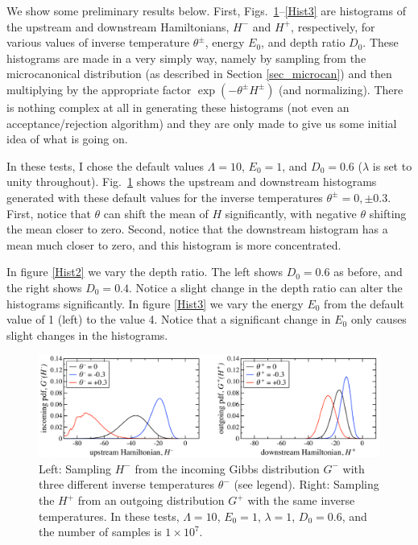 \documentclass[12pt]{article}
\begin{document}
We show some preliminary results below. First, Figs.~\ref{Hist1}--\ref{Hist3} are histograms of the upstream and downstream Hamiltonians, $H^-$ and $H^+$, respectively, for various values of inverse temperature $\theta^{\pm}$, energy $E_0$, and depth ratio $D_0$. These histograms are made in a very simply way, namely by sampling from the microcanonical distribution (as described in Section \ref{sec_microcan}) and then multiplying by the appropriate factor $\exp(-\theta^{\pm} H^{\pm})$ (and normalizing). There is nothing complex at all in generating these histograms (not even an acceptance/rejection algorithm) and they are only made to give us some initial idea of what is going on.

In these tests, I chose the default values $\Lambda = 10$, $E_0 = 1$, and $D_0 = 0.6$ ($\lambda$ is set to unity throughout). Fig.~\ref{Hist1} shows the upstream and downstream histograms generated with these default values for the inverse temperatures $\theta^{\pm} = 0, \pm 0.3$. First, notice that $\theta$ can shift the mean of $H$ significantly, with negative $\theta$ shifting the mean closer to zero. Second, notice that the downstream histogram has a mean much closer to zero, and this histogram is more concentrated.

In figure \ref{Hist2} we vary the depth ratio. The left shows $D_0 = 0.6$ as before, and the right shows $D_0 = 0.4$. Notice a slight change in the depth ratio can alter the histograms significantly. In figure \ref{Hist3} we vary the energy $E_0$ from the default value of 1 (left) to the value 4. Notice that a significant change in $E_0$ only causes slight changes in the histograms.

\begin{figure}[p]%
\begin{center}
\includegraphics[width = 0.8 \textwidth]{Hist1}
\caption{Left: Sampling $H^-$ from the incoming Gibbs distribution $G^-$ with three different inverse temperatures $\theta^-$ (see legend). Right: Sampling the $H^+$ from an outgoing distribution $G^+$ with the same inverse temperatures.
In these tests, $\Lambda = 10$, $E_0 = 1$, $\lambda = 1$, $D_0 = 0.6$, and the number of samples is $1 \times 10^7$.}
\label{Hist1}
\end{center}
\end{figure}
\end{document}
